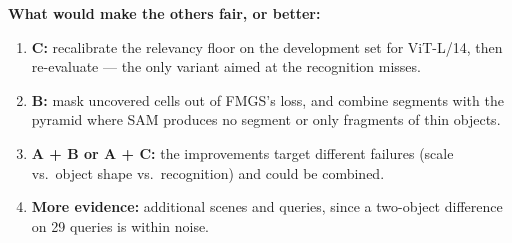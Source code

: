 \documentclass[11pt,a4paper]{article}
\begin{document}
\textbf{What would make the others fair, or better:}
\begin{enumerate}
  \item \textbf{C:} recalibrate the relevancy floor on the development set for ViT-L/14, then re-evaluate --- the
        only variant aimed at the recognition misses.
  \item \textbf{B:} mask uncovered cells out of FMGS's loss, and combine segments with the pyramid where SAM
        produces no segment or only fragments of thin objects.
  \item \textbf{A + B or A + C:} the improvements target different failures (scale vs.\ object shape vs.\
        recognition) and could be combined.
  \item \textbf{More evidence:} additional scenes and queries, since a two-object difference on 29 queries is
        within noise.
\end{enumerate}
\end{document}
